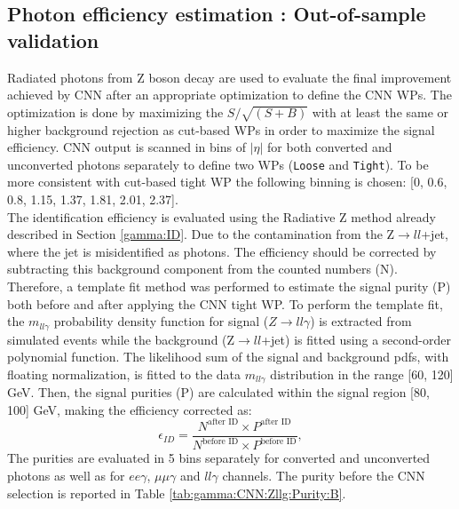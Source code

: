 \subsection{Photon efficiency estimation : Out-of-sample validation}
\label{gamma:CNN:Zllg}
Radiated photons from Z boson decay are used to evaluate the final improvement achieved by CNN after an appropriate optimization to define the CNN WPs. The optimization is done by maximizing the $S/\sqrt{(S+B)}$ with at least the same or higher background rejection as cut-based WPs in order to maximize the signal efficiency. CNN output is scanned in bins of $|\eta|$ for both converted and unconverted photons separately to define two WPs (\texttt{Loose} and \texttt{Tight}). To be more consistent with cut-based tight WP the following binning is chosen: [0, 0.6, 0.8, 1.15, 1.37, 1.81, 2.01, 2.37]. \\
The identification efficiency is evaluated using the Radiative Z method already described in Section \ref{gamma:ID}. Due to the contamination from the Z$\rightarrow ll$+jet, where the jet is misidentified as photons. The efficiency should be corrected by subtracting this background component from the counted numbers (N). Therefore, a template fit method was performed to estimate the signal purity (P) both before and after applying the CNN tight WP. To perform the template fit, the $m_{ll\gamma}$ probability density function for signal ($Z\rightarrow ll\gamma$) is extracted from simulated events while the background (Z$\rightarrow ll$+jet) is fitted using a second-order polynomial function. The likelihood sum of the signal and background pdfs, with floating normalization, is fitted to the data $m_{ll\gamma}$ distribution in the range [60, 120] GeV. Then, the signal purities (P) are calculated within the signal region [80, 100] GeV, making the efficiency corrected as: 
\begin{equation}
    \epsilon_{ID} = \frac{N^{\text{after ID}}\times P^{\text{after ID}}}{N^{\text{before ID}} \times P^{\text{before ID}}},
\end{equation}
The purities are evaluated in 5 \eT bins separately for converted and unconverted photons as well as for $ee\gamma$, $\mu\mu\gamma$ and $ll\gamma$ channels. The purity before the CNN selection is reported in Table \ref{tab:gamma:CNN:Zllg:Purity:B}. \\
